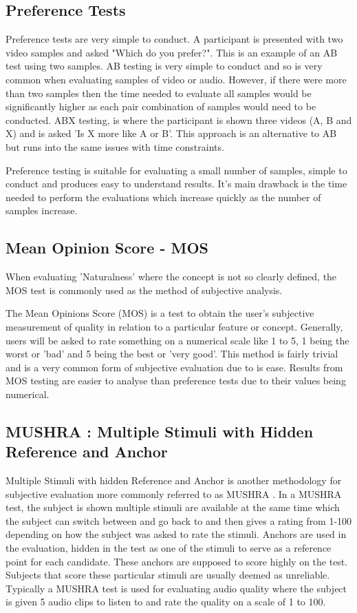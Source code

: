 \documentclass[bsc,frontabs,twoside,singlespacing,parskip]{infthesis}
\begin{document}
\subsection{Preference Tests}

Preference tests are very simple to conduct. A participant is presented with two video samples and asked "Which do you prefer?". This is an example of an AB test using two samples. AB testing is very simple to conduct and so is very common when evaluating samples of video or audio. However, if there were more than two samples then the time needed to evaluate all samples would be significantly higher as each pair combination of samples would need to be conducted. ABX testing, \cite{abx_testing} is where the participant is shown three videos (A, B and X) and is asked 'Is X more like A or B'. This approach is an alternative to AB but runs into the same issues with time constraints.

Preference testing is suitable for evaluating a small number of samples, simple to conduct and produces easy to understand results. It's main drawback is the time needed to perform the evaluations which increase quickly as the number of samples increase.

\subsection{Mean Opinion Score - MOS}

When evaluating 'Naturalness' where the concept is not so clearly defined, the MOS test is commonly used as the method of subjective analysis. \cite{mos}

The Mean Opinions Score (MOS) is a test to obtain the user's subjective measurement of quality in relation to a particular feature or concept. Generally, users will be asked to rate something on a numerical scale like 1 to 5, 1 being the worst or 'bad' and 5 being the best or 'very good'. This method is fairly trivial and is a very common form of subjective evaluation due to is ease. Results from MOS testing are easier to analyse than preference tests due to their values being numerical.

\subsection{MUSHRA : Multiple Stimuli with Hidden Reference and Anchor}

Multiple Stimuli with hidden Reference and Anchor is another methodology for subjective evaluation more commonly referred to as MUSHRA \cite{mushra}. In a MUSHRA test, the subject is shown multiple stimuli are available at the same time which the subject can switch between and go back to and then gives a rating from 1-100 depending on how the subject was asked to rate the stimuli. Anchors are used in the evaluation, hidden in the test as one of the stimuli to serve as a reference point for each candidate. These anchors are supposed to score highly on the test. Subjects that score these particular stimuli are usually deemed as unreliable. Typically a MUSHRA test is used for evaluating audio quality \cite{mushra_bbc} where the subject is given 5 audio clips to listen to and rate the quality on a scale of 1 to 100.
\end{document}
